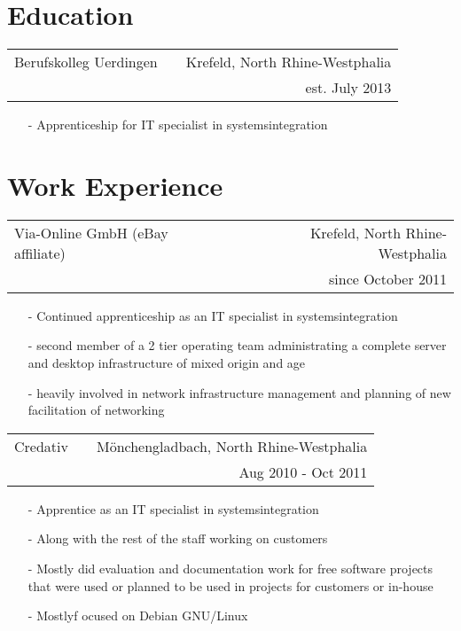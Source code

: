 \documentclass[11pt]{article}
\begin{document}
\section*{Education}
\begin{tabular}{@{ } l @{} p{3cm} @{} r @{ }}
  Berufskolleg Uerdingen & & Krefeld, North Rhine-Westphalia \\
  & & est. July 2013 \\
\end{tabular}

\begin{itemize}
  \item[-] Apprenticeship for IT specialist in systemsintegration
\end{itemize} 

\section*{Work Experience}
\begin{tabular}{@{ } l @{} p{1.2cm} @{} r @{ }}
  Via-Online GmbH (eBay affiliate) & & Krefeld, North Rhine-Westphalia\\
  & & since October 2011 \\
\end{tabular}

\begin{itemize}
  \item[-] Continued apprenticeship as an IT specialist in
    systemsintegration
  \item[-] second member of a 2 tier operating team administrating a
    complete server and desktop infrastructure of mixed origin and
    age
  \item[-] heavily involved in network infrastructure management and
    planning of new facilitation of networking
\end{itemize}

\begin{tabular}{@{ } l @{} p{3.6cm} @{} r @{ }}
  Credativ & & Mönchengladbach, North Rhine-Westphalia\\
  & & Aug 2010 - Oct 2011 \\
\end{tabular}

\begin{itemize}
  \item[-] Apprentice as an IT specialist in systemsintegration
  \item[-] Along with the rest of the staff working on customers
  \item[-] Mostly did evaluation and documentation work for free
    software projects that were used or planned to be used in projects
    for customers or in-house
  \item[-] Mostlyf ocused on Debian GNU/Linux
\end{itemize}
\end{document}
